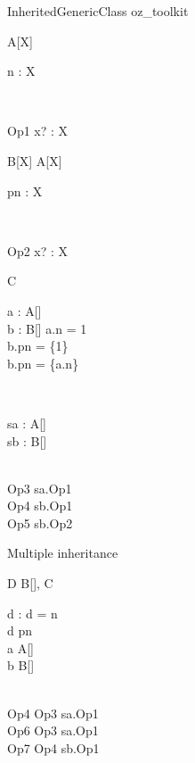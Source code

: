 \begin{zsection}
  \SECTION InheritedGenericClass \parents oz\_toolkit
\end{zsection}

\begin{class}{A[X]}
  \begin{state}
    n : X
  \end{state}\\
  \begin{op}{Op1}
    x? : X
  \end{op}
\end{class}

\begin{class}{B[X]}
  A[X]\\
  \begin{state}
    pn : \power X
  \end{state}\\
  \begin{op}{Op2}
    x? : \power X
  \end{op}
\end{class}

\begin{class}{C}
  \begin{axdef}
    a : \poly A[\nat]\\
    b : B[\nat]
  \where
    a.n = 1\\
    b.pn = \{1\}\\
    b.pn = \{a.n\}
  \end{axdef}\\
  \begin{state}
    sa : \poly A[\nat]\\
    sb : B[\nat]
  \end{state}\\
  Op3 \sdef sa.Op1\\
  Op4 \sdef sb.Op1\\
  Op5 \sdef sb.Op2
\end{class}

Multiple inheritance
\begin{class}{D}
  B[\nat], C\\
  \begin{state}
    d : \nat
  \where
    d = n\\
    d \in pn\\
    a \in \poly A[\nat]\\
    b \in B[\nat]
  \end{state}\\
  Op4 \sdef Op3 \land sa.Op1\\
  Op6 \sdef Op3 \land sa.Op1\\
  Op7 \sdef Op4 \land sb.Op1
\end{class}

